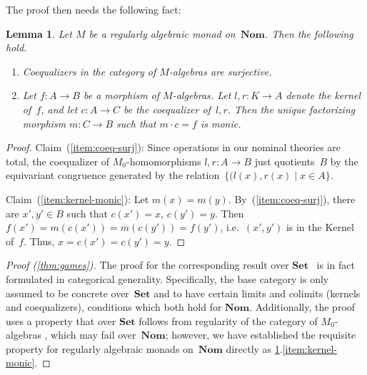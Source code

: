 \documentclass[11pt,a4paper]{amsart}
\newtheorem{lemma}[lemma]{Lemma}
\theoremstyle{plain}
\numberwithin{equation}{section}
\newcommand{\Set}{\mathbf{Set}}
\newcommand{\+}[1]{\mathcal{#1}\xspace}
\newcommand{\Nom}{\mathbf{Nom}}
\theoremstyle{definition}
\begin{document}
\noindent The proof then needs the following fact:
\begin{lemma}\label{lem:kernel-monic}
  Let $M$ be a regularly algebraic monad on~$\Nom$. Then the following
  hold.
  \begin{enumerate}
  \item\label{item:coeq-surj} Coequalizers in the category of
    $M$-algebras are surjective.
  \item\label{item:kernel-monic} Let $f\colon A\to B$ be a morphism of
    $M$-algebras. Let $l,r\colon K\to A$ denote the kernel of~$f$, and
    let $c\colon A\to C$ be the coequalizer of~$l,r$. Then the unique
    factorizing morphism $m\colon C\to B$ such that $m\cdot c=f$ is
    monic.
  \end{enumerate}
\end{lemma}
\begin{proof}
  Claim~(\ref{item:coeq-surj}): Since operations in our nominal theories
  are total, the coequalizer of $M_0$-homomorphisms $l,r\colon A\to B$
  just quotients~$B$ by the equivariant congruence generated by the
  relation~$\{(l(x),r(x)\mid x\in A\}$.

  Claim~(\ref{item:kernel-monic}): Let
  $m(x)=m(y)$. By~(\ref{item:coeq-surj}), there are $x',y'\in B$ such
  that $c(x')=x$, $c(y')=y$. Then $f(x')=m(c(x'))=m(c(y'))=f(y')$,
  i.e.~$(x',y')$ is in the Kernel of~$f$. Thus,
  \mbox{$x=c(x')=c(y')=y$}.
\end{proof}

\begin{proof}[Proof (\cref{thm:games})] The proof for the
  corresponding result over $\Set$~\cite[Theorem~6.6]{FordEA22} is in
  fact formulated in categorical generality. Specifically, the base
  category is only assumed to be concrete over~$\Set$ and to have
  certain limits and colimits (kernels and coequalizers), conditions
  which both hold for $\Nom$. Additionally, the proof uses a property
  that over $\Set$ follows from regularity of the category of
  $M_0$-algebras \cite[full version, Remark A.3]{FordEA22}, which
  may fail over~$\Nom$; however, we have established the requisite
  property for regularly algebraic monads on~$\Nom$ directly as
  \cref{lem:kernel-monic}.\ref{item:kernel-monic}.
\end{proof}
\end{document}

